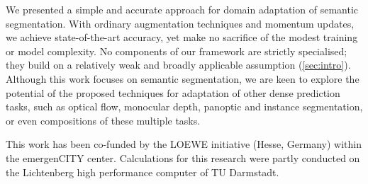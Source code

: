 
We presented a simple and accurate approach for domain adaptation of semantic segmentation.
With ordinary augmentation techniques and momentum updates, we achieve state-of-the-art accuracy,
yet make no sacrifice of the modest training or model complexity.
No components of our framework are strictly specialised; they build on a relatively weak and broadly applicable assumption (\cf \cref{sec:intro}).
Although this work focuses on semantic segmentation, we are keen to explore the potential of the proposed techniques for adaptation of other dense prediction tasks, such as optical flow, monocular depth, panoptic and instance segmentation, or even compositions of these multiple tasks.

{\small
{} This work has been co-funded by the LOEWE initiative (Hesse, Germany) within the emergenCITY center. Calculations for this research were partly conducted on the Lichtenberg high performance computer of TU Darmstadt.
}